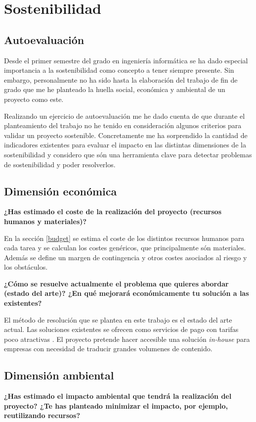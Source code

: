 \section{Sostenibilidad}
\subsection{Autoevaluación}
Desde el primer semestre del grado en ingeniería informática se ha dado especial importancia a
la sostenibilidad como concepto a tener siempre presente. Sin embargo, personalmente no ha sido hasta
la elaboración del trabajo de fin de grado que me he planteado la huella social, económica y 
ambiental de un proyecto como este.

Realizando un ejercicio de autoevaluación me he dado cuenta de que durante el planteamiento del
trabajo no he tenido en consideración algunos criterios para validar un
proyecto sostenible. Concretamente me ha sorprendido la cantidad de indicadores existentes
para evaluar el impacto en las distintas dimensiones de la sostenibilidad y considero que
són una herramienta clave para detectar problemas de sostenibilidad y poder resolverlos.

\subsection{Dimensión económica}
\textbf{¿Has estimado el coste de la realización del proyecto (recursos humanos y materiales)?}

En la sección \ref{budget} se estima el coste de los distintos recursos humanos para cada
tarea y se calculan los costes genéricos, que principalmente són materiales.
Además se define un margen de contingencia y otros costes asociados al riesgo y los obstáculos.

\textbf{¿Cómo se resuelve actualmente el problema que quieres abordar (estado del arte)?
¿En qué mejorará económicamente tu solución a las existentes?}

El método de resolución que se plantea en este trabajo es el estado del arte actual.
Las soluciones existentes se ofrecen como servicios de pago con tarifas poco atractivas
\cite{GoogleTranslatePricing,AWSTranslatePricing,MicrosoftTranslatePricing}. El proyecto pretende
hacer accesible una solución \textit{in-house} para empresas con necesidad de traducir grandes
volumenes de contenido.

\subsection{Dimensión ambiental}
\textbf{¿Has estimado el impacto ambiental que tendrá la realización del proyecto? ¿Te has
planteado minimizar el impacto, por ejemplo, reutilizando recursos?}


